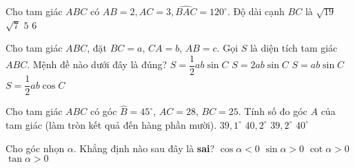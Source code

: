 \begin{ex}%
	Cho tam giác $ABC$ có $AB=2,AC=3,\widehat{BAC}=	120^\circ$. Độ dài cạnh $BC$ là
	\choice
	{\True $\sqrt{19}$}
	{$\sqrt{7}$}
	{$5$}
	{$6$}

\end{ex}

\begin{ex}%
	Cho tam giác $ABC$, đặt $BC=a$, $CA=b$, $AB=c$. Gọi $S$ là diện tích tam giác $ABC$. Mệnh đề nào dưới đây là đúng?
	\choice
	{\True $S=\dfrac{1}{2}ab\sin C$}
	{$S=2ab\sin C$}
	{$S=ab\sin C$}
	{$S=\dfrac{1}{2}ab\cos C$}
\end{ex}

\begin{ex}%
	Cho tam giác $ABC$ có góc $\widehat{B}=45^{\circ}$, $AC= 28$, $BC=25$. Tính số đo góc $A$  của tam giác (làm tròn kết quả đến hàng phần mười).
	\choice
	{$39{,}1^\circ$}
	{$40{,}2^\circ$}
	{\True $39{,}2^\circ$}
	{$40^\circ$}
\end{ex}

\begin{ex}%
	Cho  góc nhọn $\alpha$. Khẳng định nào sau đây là \textbf{sai}?
	\choice
	{\True $\cos \alpha <0 $}
	{$\sin \alpha >  0$}
	{$\cot \alpha > 0 $}
	{$\tan \alpha >0 $}
\end{ex}

